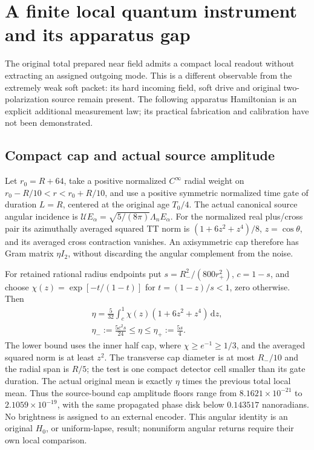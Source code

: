 \section{A finite local quantum instrument and its apparatus gap}

The original total prepared near field admits a compact local readout
without extracting an assigned outgoing mode.  This is a different
observable from the extremely weak soft packet: its hard incoming field,
soft drive and original two-polarization source remain present.  The
following apparatus Hamiltonian is an explicit additional measurement law;
its practical fabrication and calibration have not been demonstrated.

\subsection{Compact cap and actual source amplitude}
Let $r_0=R+64$, take a positive normalized $C^\infty$ radial weight on
$r_0-R/10<r<r_0+R/10$, and use a positive symmetric normalized time gate
of duration $L=R$, centered at the original age $T_0/4$.  The actual
canonical source angular incidence is
$\mathcal U E_\alpha=\sqrt{5/(8\pi)}\Lambda_nE_\alpha$.
For the normalized real plus/cross pair its azimuthally averaged squared
TT norm is $(1+6z^2+z^4)/8$, $z=\cos\theta$, and its averaged cross
contraction vanishes.  An axisymmetric cap therefore has Gram matrix
$\eta I_2$, without discarding the angular complement from the noise.

For retained rational radius endpoints put
$s=R_-^2/(800r_+^2)$, $c=1-s$, and choose
$\chi(z)=\exp[-t/(1-t)]$ for $t=(1-z)/s<1$, zero otherwise.
Then
\begin{equation}
 \begin{gathered}
 \eta=\frac5{32}\int_c^1\chi(z)(1+6z^2+z^4)\,\mathrm dz,
 \\
 \eta_-:=\frac{5c^2s}{24}\leq\eta\leq\eta_+:=\frac{5s}{4}.
 \end{gathered}
\end{equation}
The lower bound uses the inner half cap, where
$\chi\geq e^{-1}\geq1/3$, and the averaged squared norm is at least
$z^2$.  The transverse cap diameter is at most $R_-/10$ and the radial
span is $R/5$; the test is one compact detector cell smaller than its
gate duration.  The actual original mean is exactly $\eta$ times the
previous total local mean.  Thus the source-bound cap amplitude floors
range from $8.1621\times10^{-21}$ to $2.1059\times10^{-19}$, with the
same propagated phase disk below $0.143517$ nanoradians.  No brightness is
assigned to an external encoder.  This angular identity is an original
$H_0$, or uniform-lapse, result; nonuniform angular returns require their
own local comparison.


